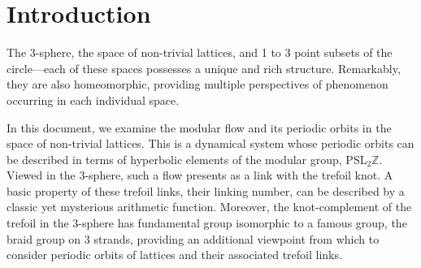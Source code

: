 \documentclass[12pt,twoside]{reedthesis}
\title{}
\author{}
\date{}
\theoremstyle{definition}
\newcommand{\Z}{\mathbb{Z}}
\newcommand{\PSLZ}{\mathrm{PSL}_2{\Z}}
\begin{document}
\maketitle
\setlength{\parskip}{0pt}
\frontmatter %
\pagestyle{empty} %





\tableofcontents




\setlength{\parskip}{1em}
\mainmatter
\pagestyle{fancyplain}

\chapter*{Introduction}

The 3-sphere, the space of non-trivial lattices, and 1 to 3 point subsets of the circle---each of these spaces possesses a unique and rich structure.
Remarkably, they are also homeomorphic, providing multiple perspectives of phenomenon occurring in each individual space.

In this document, we examine the modular flow and its periodic orbits in the space of non-trivial lattices.
This is a dynamical system whose periodic orbits can be described in terms of hyperbolic elements of the modular group, $\PSLZ$.
Viewed in the 3-sphere, such a flow presents as a link with the trefoil knot.
A basic property of these trefoil links, their linking number, can be described by a classic yet mysterious arithmetic function.
Moreover, the knot-complement of the trefoil in the 3-sphere has fundamental group isomorphic to a famous group, the braid group on 3 strands, providing an additional viewpoint from which to consider periodic orbits of lattices and their associated trefoil links.
\end{document}
